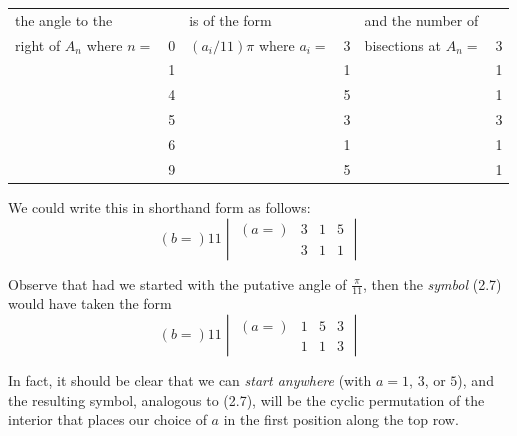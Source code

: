\begin{center}
\begin{tabular}{lclclc}
\small{the angle to the}           &   & \small{is of the form}              &   & \small{and the number of}     &   \\
\small{right of $A_n$ where $n =$} & 0 & \small{$(a_i/11)\pi$ where $a_i =$} & 3 & \small{bisections at $A_n =$} & 3 \\
                                   & 1 &                                     & 1 &                               & 1 \\
                                   & 4 &                                     & 5 &                               & 1 \\
                                   & 5 &                                     & 3 &                               & 3 \\
                                   & 6 &                                     & 1 &                               & 1 \\
                                   & 9 &                                     & 5 &                               & 1 \\
\end{tabular}
\end{center}

We could write this in shorthand form as follows:
\begin{equation}
(b=) 11 
\begin{vmatrix}
(a=) & 3 & 1 & 5 \\
     & 3 & 1 & 1 
\end{vmatrix}  \tag{2.7}
\end{equation}

Observe that had we started with the putative angle of $\frac{\pi}{11}$, then the \emph{symbol} (2.7) would have taken the form
\begin{equation}
(b=) 11 
\begin{vmatrix}
(a=) & 1 & 5 & 3 \\
     & 1 & 1 & 3 
\end{vmatrix}  \tag{2.7'}
\end{equation}

In fact, it should be clear that we can \emph{start anywhere} (with $a = 1$, $3$, or $5$), and the resulting symbol, analogous to (2.7), will be the cyclic permutation of the interior that places our choice of $a$ in the first position along the top row.

